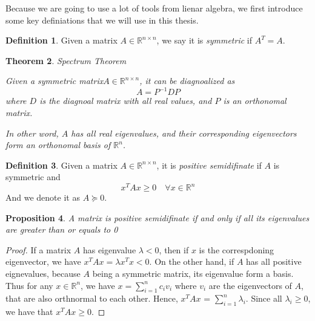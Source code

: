 \documentclass[12pt]{amsart}
\numberwithin{equation}{section}
\newtheorem{thm}{Theorem}
\newtheorem{prop}[thm]{Proposition}
\theoremstyle{definition}
\newtheorem{definition}[thm]{Definition}
\numberwithin{thm}{section}
\begin{document}
Because we are going to use a lot of tools from lienar algebra, we first introduce some key definiations that we will use in this thesis.

\begin{definition}
     Given a matrix $A \in \mathbb{R}^{n \times n}$, we say it is \emph{symmetric} if $A^T = A$.
\end{definition}


\begin{thm} Spectrum Theorem

     Given a symmetric matrix$A \in \mathbb{R}^{n \times n}$, it can be diagnoalized as \begin{equation} A = P^{-1}DP \end{equation} where $D$ is the diagnoal matrix with all real values, and $P$ is an orthonomal matrix.
     
     In other word, $A$ has all real eigenvalues, and their corresponding eigenvectors form an orthonomal basis of $\mathbb{R}^n$. \cite{golub1996matrix}
     
\end{thm} 


\begin{definition}
     Given a matrix $A \in \mathbb{R}^{n \times n}$, it is \emph{positive semidifinate} if $A$ is symmetric and \begin{equation}
          x^T A x \geq 0 \quad \forall x \in \mathbb{R}^n
     \end{equation}
     And we denote it as $A \succcurlyeq 0$.
\end{definition}

\begin{prop}
     A matrix is \emph{positive semidifinate} if and only if all its eigenvalues are greater than or equals to 0
\end{prop}

\begin{proof}
     If a matrix $A$ has eigenvalue $\lambda < 0$, then if $x$ is the correspdoning eigenvector, we have $x^T A x = \lambda x^T x < 0$.
     On the other hand, if $A$ has all positive eignevalues, because $A$ being a symmetric matrix, its eigenvalue form a basis. Thus for any $x \in \mathbb{R}^n$, we have
     $x = \sum_{i = 1} ^ n c_i v_i $ where $v_i$ are the eigenvectors of $A$, that are also orthnormal to each other.
     Hence, $x^T A x$ = $\sum_{i = 1} ^ n \lambda_i$. Since all $\lambda_i \geq 0$, we have that $x ^ T A x \geq 0$.

\end{proof}
\end{document}
